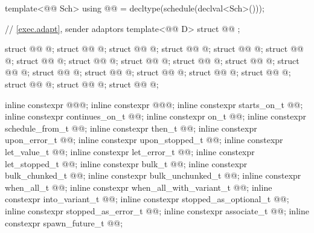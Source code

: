 \begin{codeblock}
{  template<@@ Sch>
    using @@ = decltype(schedule(declval<Sch>()));

  // \ref{exec.adapt}, sender adaptors
  template<@@ D>
    struct @@ { };

  struct @@ { @\unspec@ };
  struct @@ { @\unspec@ };
  struct @@ { @\unspec@ };
  struct @@ { @\unspec@ };
  struct @@ { @\unspec@ };
  struct @@ { @\unspec@ };
  struct @@ { @\unspec@ };
  struct @@ { @\unspec@ };
  struct @@ { @\unspec@ };
  struct @@ { @\unspec@ };
  struct @@ { @\unspec@ };
  struct @@ { @\unspec@ };
  struct @@ { @\unspec@ };
  struct @@ { @\unspec@ };
  struct @@ { @\unspec@ };
  struct @@ { @\unspec@ };
  struct @@ { @\unspec@ };
  struct @@ { @\unspec@ };
  struct @@ { @\unspec@ };
  struct @@ { @\unspec@ };

  inline constexpr @\unspec@ @@{};
  inline constexpr @\unspec@ @@{};
  inline constexpr starts_on_t @@{};
  inline constexpr continues_on_t @@{};
  inline constexpr on_t @@{};
  inline constexpr schedule_from_t @@{};
  inline constexpr then_t @@{};
  inline constexpr upon_error_t @@{};
  inline constexpr upon_stopped_t @@{};
  inline constexpr let_value_t @@{};
  inline constexpr let_error_t @@{};
  inline constexpr let_stopped_t @@{};
  inline constexpr bulk_t @@{};
  inline constexpr bulk_chunked_t @@{};
  inline constexpr bulk_unchunked_t @@{};
  inline constexpr when_all_t @@{};
  inline constexpr when_all_with_variant_t @@{};
  inline constexpr into_variant_t @@{};
  inline constexpr stopped_as_optional_t @@{};
  inline constexpr stopped_as_error_t @@{};
  inline constexpr associate_t @@{};
  inline constexpr spawn_future_t @@{};
}


\end{codeblock}
